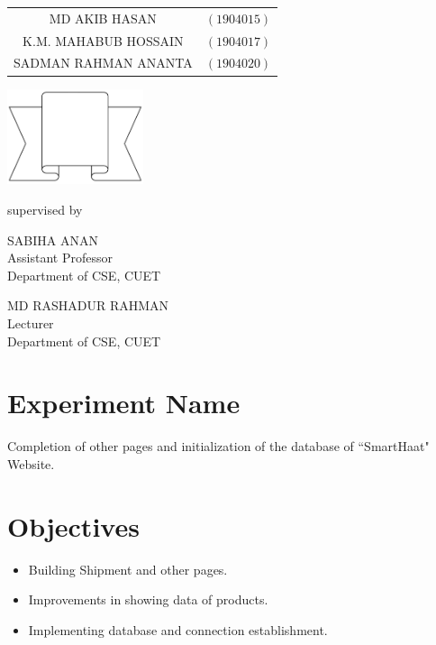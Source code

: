 \documentclass[a4paper,12pt]{report}
\begin{document}
\begin{titlepage}
{		\begin{tabular}{cl}
			MD AKIB HASAN        & $(1904015)$ \\
K.M. MAHABUB HOSSAIN & $(1904017)$ \\
			SADMAN RAHMAN ANANTA & $(1904020)$ \\
		\end{tabular}
	}
	\parbox[r]{6cm}{
		\vspace{1cm}
		\begin{center}
			\includegraphics[width=4cm, keepaspectratio]{remarks.png}
		\end{center}
	}

	\vspace{0.5cm}
	supervised by

	\parbox[l]{7.5cm}{\begin{center}

			SABIHA ANAN\\
\footnotesize{Assistant Professor\\
				Department of CSE, CUET}
		\end{center}
	}
	\parbox[r]{7.5cm}{\begin{center}

			MD RASHADUR RAHMAN\\
\footnotesize{Lecturer \\
				Department of CSE, CUET}
		\end{center}
	}

	\vfill
\end{titlepage}


\onehalfspacing

\section*{Experiment Name}
Completion of other pages and initialization of the database of ``SmartHaat" Website.
\section*{Objectives}
\begin{itemize}
\item Building Shipment and other pages.
\item Improvements in showing data of products.
\item Implementing database and connection establishment.
\end{itemize}
\end{document}
